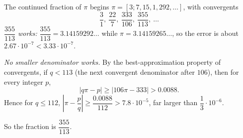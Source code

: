 The continued fraction of \(\pi\) begins \(\pi=[3;7,15,1,292,\dots]\), with convergents
\[
\dfrac{3}{1},\ \dfrac{22}{7},\ \dfrac{333}{106},\ \dfrac{355}{113},\ \dots
\]
\emph{\(\dfrac{355}{113}\) works:} \(\dfrac{355}{113}=3.14159292\ldots\) while \(\pi=3.14159265\ldots\), so the error is about \(2.67\cdot10^{-7}<3.33\cdot10^{-7}\).

\emph{No smaller denominator works.} By the best-approximation property of convergents, if \(q<113\) (the next convergent denominator after \(106\)), then for every integer \(p\),
\[
|q\pi-p|\ge|106\pi-333|>0.0088 .
\]
Hence for \(q\le112\), \(\left|\pi-\dfrac {p}{q}\right|\ge\dfrac{0.0088}{112}>7.8\cdot10^{-5}\), far larger than \(\dfrac{1}{3}\cdot10^{-6}\).

So the fraction is \(\boxed{\dfrac{355}{113}}\).
